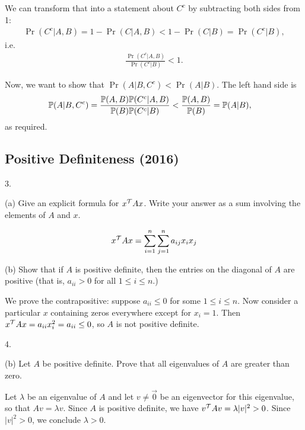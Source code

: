 \begin{enumerate}[label=(\alph*)]
\begin{mdframed}
      We can transform that into a statement about $C^c$ by subtracting both sides from 1:
      \begin{align*}
        \Pr(C^c|A,B) = 1 - \Pr(C|A,B) < 1 - \Pr(C|B) = \Pr(C^c|B),
      \end{align*}
      i.e.
      \begin{align*}
        \frac{\Pr(C^c|A,B)}{\Pr(C^c|B)} < 1.
      \end{align*}

      Now, we want to show that $\Pr(A|B, C^c) < \Pr(A|B)$. The left hand side is
      \begin{align*}
        \P(A|B, C^c)
        &= \frac{\P(A,B)\P(C^c|A,B)}{\P(B)\P(C^c|B)}
        < \frac{\P(A,B)}{\P(B)} = \P(A|B),
      \end{align*}
      as required.

    \end{mdframed}

\end{enumerate}

\newpage

\subsection{Positive Definiteness (2016)}

3.

(a) Give an explicit formula for $x^\T Ax$. Write your answer as a sum
involving the elements of $A$ and $x$.

\begin{mdframed}
  \begin{align*}
    x^\T A x = \sum_{i=1}^n \sum_{j=1}^n a_{ij}x_ix_j
  \end{align*}
\end{mdframed}

(b) Show that if $A$ is positive definite, then the entries on the diagonal of
$A$ are positive (that is, $a_{ii} > 0$ for all $1 \leq i \leq n$.)

\begin{mdframed}
  We prove the contrapositive: suppose $a_{ii} \leq 0$ for some
  $1 \leq i \leq n$. Now consider a particular $x$ containing zeros everywhere
  except for $x_i = 1$. Then $x^\T A x = a_{ii}x_i^2 = a_{ii} \leq 0$, so $A$
  is not positive definite.
\end{mdframed}


4.

(b) Let $A$ be positive definite. Prove that all eigenvalues of $A$ are greater than zero.
\begin{mdframed}
  Let $\lambda$ be an eigenvalue of $A$ and let $v \neq \vec 0$ be an eigenvector for
  this eigenvalue, so that $Av = \lambda v$. Since $A$ is positive
  definite, we have $v^\T Av = \lambda |v|^2 > 0$. Since
  $|v|^2 > 0$, we conclude $\lambda > 0$.
\end{mdframed}

